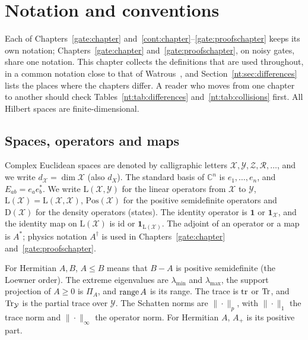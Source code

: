 \chapter{Notation and conventions}\label{nt:chapter}
\begingroup

Each of Chapters~\ref{gate:chapter} and~\ref{cont:chapter}--\ref{gate:proofschapter} keeps its own notation; Chapters~\ref{gate:chapter} and~\ref{gate:proofschapter}, on noisy gates, share one notation. This chapter collects the definitions that are used throughout, in a common notation close to that of Watrous~\cite{watrous2018theory}, and Section~\ref{nt:sec:differences} lists the places where the chapters differ. A reader who moves from one chapter to another should check Tables~\ref{nt:tab:differences} and~\ref{nt:tab:collisions} first. All Hilbert spaces are finite-dimensional.

\section{Spaces, operators and maps}\label{nt:sec:spaces}

Complex Euclidean spaces are denoted by calligraphic letters $\mathcal X,\mathcal Y,\mathcal Z,\mathcal R,\dots$, and we write $d_{\mathcal X}=\dim\mathcal X$ (also $d_X$). The standard basis of $\mathbb C^n$ is $e_1,\dots,e_n$, and $E_{ab}=e_ae_b^*$. We write $\mathrm L(\mathcal X,\mathcal Y)$ for the linear operators from $\mathcal X$ to $\mathcal Y$, $\mathrm L(\mathcal X)=\mathrm L(\mathcal X,\mathcal X)$, $\mathrm{Pos}(\mathcal X)$ for the positive semidefinite operators and $\mathrm D(\mathcal X)$ for the density operators (states). The identity operator is $\mathbf 1$ or $\mathbf 1_{\mathcal X}$, and the identity map on $\mathrm L(\mathcal X)$ is $\mathrm{id}$ or $\mathbf 1_{\mathrm L(\mathcal X)}$. The adjoint of an operator or a map is $A^*$; physics notation $A^\dagger$ is used in Chapters~\ref{gate:chapter} and~\ref{gate:proofschapter}.

For Hermitian $A,B$, $A\le B$ means that $B-A$ is positive semidefinite (the Loewner order). The extreme eigenvalues are $\lambda_{\min}$ and $\lambda_{\max}$, the support projection of $A\ge0$ is $\Pi_A$, and $\operatorname{range} A$ is its range. The trace is $\operatorname{tr}$ or $\operatorname{Tr}$, and $\operatorname{Tr}_{\mathcal Y}$ is the partial trace over $\mathcal Y$. The Schatten norms are $\|\cdot\|_p$, with $\|\cdot\|_1$ the trace norm and $\|\cdot\|_\infty$ the operator norm. For Hermitian $A$, $A_+$ is its positive part.

